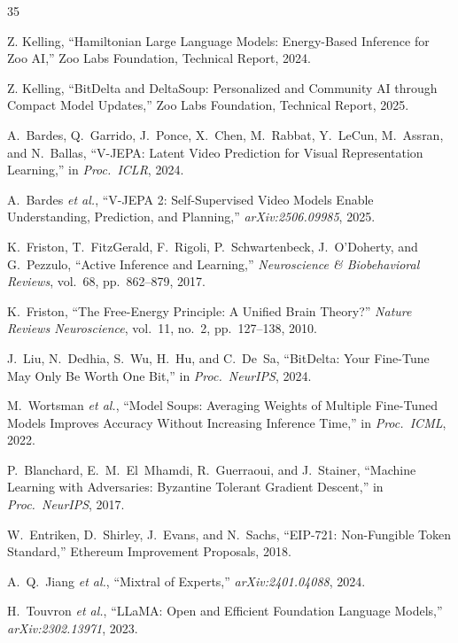 \documentclass[11pt,letterpaper]{article}
\begin{document}

\begin{thebibliography}{35}

Z. Kelling, ``Hamiltonian Large Language Models: Energy-Based Inference for Zoo AI,'' Zoo Labs Foundation, Technical Report, 2024.

Z. Kelling, ``BitDelta and DeltaSoup: Personalized and Community AI through Compact Model Updates,'' Zoo Labs Foundation, Technical Report, 2025.

A.~Bardes, Q.~Garrido, J.~Ponce, X.~Chen, M.~Rabbat, Y.~LeCun, M.~Assran, and N.~Ballas, ``V-JEPA: Latent Video Prediction for Visual Representation Learning,'' in \emph{Proc.\ ICLR}, 2024.

A.~Bardes \emph{et al.}, ``V-JEPA 2: Self-Supervised Video Models Enable Understanding, Prediction, and Planning,'' \emph{arXiv:2506.09985}, 2025.

K.~Friston, T.~FitzGerald, F.~Rigoli, P.~Schwartenbeck, J.~O'Doherty, and G.~Pezzulo, ``Active Inference and Learning,'' \emph{Neuroscience \& Biobehavioral Reviews}, vol.~68, pp.~862--879, 2017.

K.~Friston, ``The Free-Energy Principle: A Unified Brain Theory?'' \emph{Nature Reviews Neuroscience}, vol.~11, no.~2, pp.~127--138, 2010.

J.~Liu, N.~Dedhia, S.~Wu, H.~Hu, and C.~De~Sa, ``BitDelta: Your Fine-Tune May Only Be Worth One Bit,'' in \emph{Proc.\ NeurIPS}, 2024.

M.~Wortsman \emph{et al.}, ``Model Soups: Averaging Weights of Multiple Fine-Tuned Models Improves Accuracy Without Increasing Inference Time,'' in \emph{Proc.\ ICML}, 2022.

P.~Blanchard, E.~M.~El~Mhamdi, R.~Guerraoui, and J.~Stainer, ``Machine Learning with Adversaries: Byzantine Tolerant Gradient Descent,'' in \emph{Proc.\ NeurIPS}, 2017.

W.~Entriken, D.~Shirley, J.~Evans, and N.~Sachs, ``EIP-721: Non-Fungible Token Standard,'' Ethereum Improvement Proposals, 2018.

A.~Q.~Jiang \emph{et al.}, ``Mixtral of Experts,'' \emph{arXiv:2401.04088}, 2024.

H.~Touvron \emph{et al.}, ``LLaMA: Open and Efficient Foundation Language Models,'' \emph{arXiv:2302.13971}, 2023.


\end{thebibliography}
\end{document}
